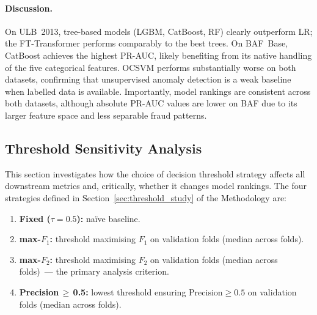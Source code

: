 \paragraph{Discussion.}
On ULB~2013, tree-based models (LGBM, CatBoost, RF) clearly outperform LR;
the FT-Transformer performs comparably to the best trees.
On BAF~Base, CatBoost achieves the highest PR-AUC, likely benefiting from
its native handling of the five categorical features.
OCSVM performs substantially worse on both datasets, confirming that
unsupervised anomaly detection is a weak baseline when labelled data is available.
Importantly, model rankings are consistent across both datasets,
although absolute PR-AUC values are lower on BAF due to its larger
feature space and less separable fraud patterns.



\subsection{Threshold Sensitivity Analysis}
\label{sec:threshold_sensitivity}

This section investigates how the choice of decision threshold strategy
affects all downstream metrics and, critically, whether it changes model rankings.
The four strategies defined in Section~\ref{sec:threshold_study} of the Methodology are:
\begin{enumerate}
  \item \textbf{Fixed ($\tau=0.5$):} na\"ive baseline.
  \item \textbf{max-$F_1$:} threshold maximising $F_1$ on validation folds (median across folds).
  \item \textbf{max-$F_2$:} threshold maximising $F_2$ on validation folds (median across folds)~--- the primary analysis criterion.
  \item \textbf{Precision\,$\geq$\,0.5:} lowest threshold ensuring $\text{Precision} \geq 0.5$ on validation folds (median across folds).
\end{enumerate}

